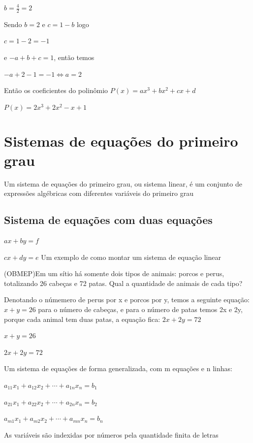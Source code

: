 \begin{multicols*}{2}
\begin{enumerate}[wide, labelwidth=!, labelindent=0pt]
\begin{enumerate}
                        $b = \frac{4}{2} = 2$

                        Sendo $b = 2$ e $c = 1 - b$ logo

                        $c = 1 - 2 = -1$

                        e $-a+b+c = 1$, então temos

                        $-a +2 - 1 = -1 \Leftrightarrow a = 2$

                        Então os coeficientes do polinômio $P(x) = ax^3 + bx^2 + cx + d$

                        $P(x) = 2x^3 +2x^2 -x +1$
              \end{enumerate}
    \end{enumerate}

    \section*{Sistemas de equações do primeiro grau}
    Um sistema de equações do primeiro grau, ou sistema linear, é um conjunto de expressões 				algébricas com diferentes variáveis do primeiro grau
    \subsection*{Sistema de equações com duas equações}
    $ax + by = f $

    $cx + dy = e$
    Um exemplo de como montar um sistema de equação linear

    (OBMEP)Em um sítio há somente dois tipos de animais: porcos e perus, totalizando 26 cabeças e 			72 patas. Qual a quantidade de animais de cada tipo?

    Denotando o númemero de perus por x e porcos por y, temos a seguinte equação: $x + y =26$ para 			o número de cabeças, e para o número de patas temos 2x e 2y, porque cada animal tem duas patas, 		a equação fica: $2x + 2y = 72$

    $x+y=26$

    $2x+2y = 72$

    Um sistema de equações de forma generalizada, com m equações e n linhas:

    $a_{11}x_1 + a_{12}x_2 + \cdots + a_{1n}x_n = b_1$

    $a_{21}x_1 + a_{22}x_2 + \cdots + a_{2n}x_n = b_2$

    $a_{m1}x_1 + a_{m2}x_2 + \cdots + a_{mn}x_n = b_n$

    As variáveis são indexidas por números pela quantidade finita de letras


\end{multicols*}
